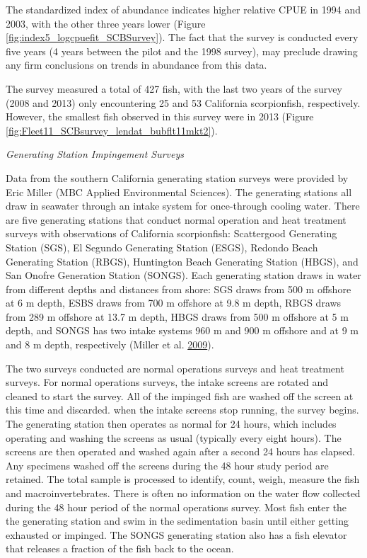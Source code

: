\documentclass[12pt,]{article}
\begin{document}
The standardized index of abundance indicates higher relative CPUE in
1994 and 2003, with the other three years lower (Figure
\ref{fig:index5_logcpuefit_SCBSurvey}). The fact that the survey is
conducted every five years (4 years between the pilot and the 1998
survey), may preclude drawing any firm conclusions on trends in
abundance from this data.

The survey measured a total of 427 fish, with the last two years of the
survey (2008 and 2013) only encountering 25 and 53 California
scorpionfish, respectively.\\
However, the smallest fish observed in this survey were in 2013 (Figure
\ref{fig:Fleet11_SCBsurvey_lendat_bubflt11mkt2}).

\emph{Generating Station Impingement Surveys}

Data from the southern California generating station surveys were
provided by Eric Miller (MBC Applied Environmental Sciences). The
generating stations all draw in seawater through an intake system for
once-through cooling water. There are five generating stations that
conduct normal operation and heat treatment surveys with observations of
California scorpionfish: Scattergood Generating Station (SGS), El
Segundo Generating Station (ESGS), Redondo Beach Generating Station
(RBGS), Huntington Beach Generating Station (HBGS), and San Onofre
Generation Station (SONGS). Each generating station draws in water from
different depths and distances from shore: SGS draws from 500 m offshore
at 6 m depth, ESBS draws from 700 m offshore at 9.8 m depth, RBGS draws
from 289 m offshore at 13.7 m depth, HBGS draws from 500 m offshore at 5
m depth, and SONGS has two intake systems 960 m and 900 m offshore and
at 9 m and 8 m depth, respectively (Miller et al.
\protect\hyperlink{ref-Miller2009}{2009}).

The two surveys conducted are normal operations surveys and heat
treatment surveys. For normal operations surveys, the intake screens are
rotated and cleaned to start the survey. All of the impinged fish are
washed off the screen at this time and discarded. when the intake
screens stop running, the survey begins. The generating station then
operates as normal for 24 hours, which includes operating and washing
the screens as usual (typically every eight hours). The screens are then
operated and washed again after a second 24 hours has elapsed. Any
specimens washed off the screens during the 48 hour study period are
retained. The total sample is processed to identify, count, weigh,
measure the fish and macroinvertebrates. There is often no information
on the water flow collected during the 48 hour period of the normal
operations survey. Most fish enter the the generating station and swim
in the sedimentation basin until either getting exhausted or impinged.
The SONGS generating station also has a fish elevator that releases a
fraction of the fish back to the ocean.
\end{document}
